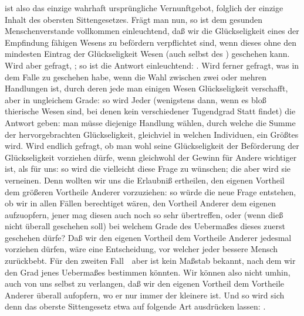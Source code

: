 \begin{aufza}
\item {} ist also das einzige wahrhaft ursprüngliche Vernunftgebot, folglich der einzige Inhalt des obersten Sittengesetzes. Frägt man nun,  so ist dem gesunden Menschenverstande vollkommen einleuchtend, daß wir die Glückseligkeit eines  der Empfindung fähigen Wesens  zu befördern verpflichtet sind, wenn dieses ohne den mindesten Eintrag der Glückseligkeit  Wesen (auch selbst des ) geschehen kann. Wird aber gefragt, ; so ist die Antwort einleuchtend: . Wird ferner gefragt, was in dem Falle zu geschehen habe, wenn die Wahl zwischen zwei oder mehren Handlungen ist, durch deren jede man einigen Wesen Glückseligkeit verschafft, aber in ungleichem Grade: so wird Jeder (wenigstens dann, wenn es bloß thierische Wesen sind, bei denen kein verschiedener Tugendgrad Statt findet) die Antwort geben: man müsse diejenige Handlung wählen, durch welche die Summe der hervorgebrachten Glückseligkeit, gleichviel in welchen Individuen, ein Größtes wird. Wird endlich gefragt, ob man wohl seine  Glückseligkeit der Beförderung der Glückseligkeit  vorziehen dürfe, wenn gleichwohl der Gewinn für Andere wichtiger ist, als für uns: so wird die  vielleicht diese Frage zu  wünschen; die  aber wird sie verneinen. Denn wollten wir uns die Erlaubniß ertheilen, den eigenen Vortheil dem größeren Vortheile Anderer vorzuziehen: so würde die neue Frage entstehen, ob wir in allen Fällen berechtiget wären, den Vortheil Anderer dem eigenen aufzuopfern, jener mag diesen auch noch so sehr übertreffen, oder (wenn dieß nicht überall geschehen soll) bei welchem Grade des Uebermaßes dieses zuerst geschehen dürfe? Daß wir den eigenen Vortheil dem Vortheile Anderer jedesmal vorziehen dürfen, wäre eine Entscheidung, vor welcher jeder bessere Mensch zurückbebt. Für den zweiten Fall~\ aber ist kein Maßstab bekannt, nach dem wir den Grad jenes Uebermaßes bestimmen könnten. Wir können also nicht umhin, auch von uns selbst zu verlangen, daß wir den eigenen Vortheil dem Vortheile Anderer überall aufopfern, wo er nur immer der kleinere ist. Und so wird sich denn das oberste Sittengesetz etwa auf folgende Art ausdrücken lassen: .

\end{aufza}

